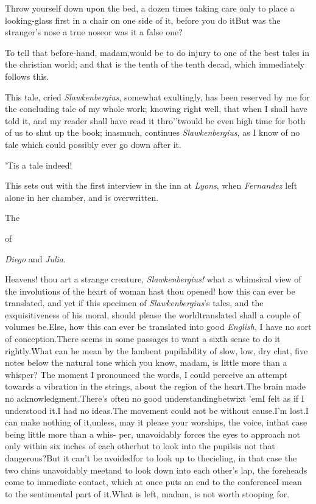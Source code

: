 \documentclass{article}
\begin{document}
\tsk Throw yourself down upon the bed, a dozen times\tsk
taking care only to place a looking-glass first in a chair
on one side of it, before you do it\tsh But was the\pb
stranger’s nose a true nose\tsk or was it a false one?

To tell that before-hand, madam,\break would be to do injury to one of
the best tales in the christian world; and that is the tenth of the
tenth decad, which immediately follows this.

This tale, cried \textit{Slawkenbergius}, somewhat exultingly, has
been reserved by me for the concluding tale of my whole work;
knowing right well, that when I shall have told it, and my reader
shall have read it thro’\tsk ’twould be even high
time for both of us to shut up the book; inasmuch, continues
\textit{Slawkenbergius}, as I know of no tale which could possibly
ever go down after it.

\tsh ’Tis a tale indeed!

This sets out with the first interview in the inn at
\textit{Lyons}, when \textit{Fernandez} left 
alone in her chamber, and is overwritten.

\bigskip
\centerline{The\enspace{}}
\centerline{of}
\centerline{\textit{Diego} and \textit{Julia.}}

Heavens! thou art a strange creature, \textit{Slawkenbergius!}
what a whimsical view of the involutions of the heart of woman hast
thou opened! how this can ever be translated, and yet if this
specimen of \textit{Slawkenbergius}’s tales, and the
exquisitiveness of his moral, should please the
world\tsk translated shall a couple of volumes
be.\tsk Else, how this can ever be translated into good
\textit{English}, I have no sort of conception.\tsk There seems in
some passages to want a sixth sense to do it\pb
rightly.\tsh What can he mean by the\break 
lambent pupilability of slow, low, dry\break
chat, five notes below the natural tone\break
\tsh which you know, madam, is little more than a
whisper? The moment I pronounced the words, I could perceive an
attempt towards a vibration in the strings, about the region of the
heart.\tsh The brain made no
acknowledgment.\tsh There’s often no good
understanding\break betwixt ’em\tsk I felt as if I understood
it.\tsk I had no ideas.\tsk The movement could
not be without cause.\tsk I’m lost.\break I can make nothing of
it,\tsk unless, may\break
it please your worships, the voice, in\break that
case being little more than a whis-\break
per, unavoidably forces the eyes to\break
approach not only within six inches\break
of each other\tsk but to look into the\break
pupils\tsk is not that dangerous?\tsh But it\break
can’t be avoided\tsk for to look up to the\pb cieling, in
that case the two chins unavoidably meet\tsk and to look
down into each other’s lap, the foreheads come to immediate
contact, which at once puts an end to the conference\tsk I
mean to the sentimental part of it.\tsh What is left,
madam, is not worth stooping for.
\end{document}
